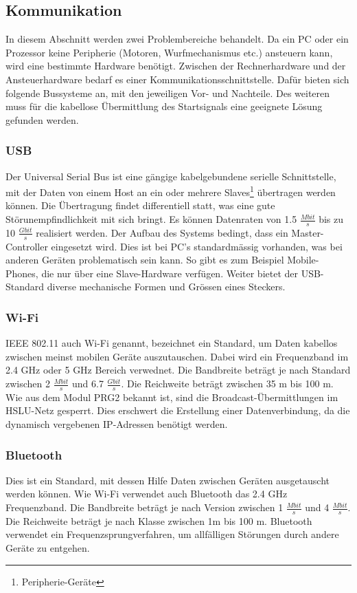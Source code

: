 \subsection{Kommunikation}
In diesem Abschnitt werden zwei Problembereiche behandelt. Da ein PC oder ein Prozessor keine Peripherie (Motoren, Wurfmechanismus etc.) ansteuern kann, wird eine bestimmte Hardware benötigt. Zwischen der Rechnerhardware und der Ansteuerhardware bedarf es einer Kommunikationsschnittstelle. Dafür bieten sich folgende Bussysteme an, mit den jeweiligen Vor- und Nachteile. Des weiteren muss für die kabellose Übermittlung des Startsignals eine geeignete Lösung gefunden werden.

\subsubsection{USB}
Der Universal Serial Bus ist eine gängige kabelgebundene serielle Schnittstelle, mit der Daten von einem Host an ein oder mehrere Slaves\footnote{Peripherie-Geräte} übertragen werden können. Die Übertragung findet differentiell statt, was eine gute Störunempfindlichkeit mit sich bringt. Es können Datenraten von 1.5 $\frac{Mbit}{s}$ bis zu 10 $\frac{Gbit}{s}$ realisiert werden. Der Aufbau des Systems bedingt, dass ein Master-Controller eingesetzt wird. Dies ist bei PC's standardmässig vorhanden, was bei anderen Geräten problematisch sein kann. So gibt es zum Beispiel Mobile-Phones, die nur über eine Slave-Hardware verfügen. Weiter bietet der USB-Standard diverse mechanische Formen und Grössen eines Steckers.

\subsubsection{Wi-Fi}
IEEE 802.11 auch Wi-Fi genannt, bezeichnet ein Standard, um Daten kabellos zwischen meinst mobilen Geräte auszutauschen. Dabei wird ein Frequenzband im 2.4 GHz oder 5 GHz Bereich verwednet. Die Bandbreite beträgt je nach Standard zwischen 2 $\frac{Mbit}{s}$ und 6.7 $\frac{Gbit}{s}$. Die Reichweite beträgt zwischen 35 m bis 100 m. Wie aus dem Modul PRG2 bekannt ist, sind die Broadcast-Übermittlungen im HSLU-Netz gesperrt. Dies erschwert die Erstellung einer Datenverbindung, da die dynamisch vergebenen IP-Adressen benötigt werden.

\subsubsection{Bluetooth}
Dies ist ein Standard, mit dessen Hilfe Daten zwischen Geräten ausgetauscht werden können. Wie Wi-Fi verwendet auch Bluetooth das 2.4 GHz Frequenzband. Die Bandbreite beträgt je nach Version zwischen 1 $\frac{Mbit}{s}$ und 4 $\frac{Mbit}{s}$. Die Reichweite beträgt je nach Klasse zwischen 1m bis 100 m. Bluetooth verwendet ein Frequenzsprungverfahren, um allfälligen Störungen durch andere Geräte zu entgehen.